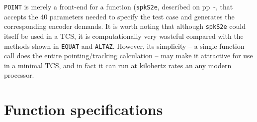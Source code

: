 \documentclass[11pt,fleqn,twoside,\paper]{article}
\renewcommand{\_}{{\tt\char'137}}     %
\begin{document}
{\tt POINT} is merely a front-end for a function ({\tt spkS2e},
described on pp~\pageref{spkS2e}-\pageref{end_spkS2e},
that accepts the 40 parameters
needed to specify the test case and generates the corresponding
encoder demands.  It is worth noting that although {\tt spkS2e}
could itself be used in a TCS, it is computationally very
wasteful compared with the methods shown in {\tt EQUAT} and
{\tt ALTAZ}.  However, its simplicity -- a single function
call does the entire pointing/tracking calculation -- may
make it attractive for use in a minimal TCS, and in fact it
can run at kilohertz rates an any modern processor.

\newpage

\section{Function specifications}
\label{specs}

\end{document}
